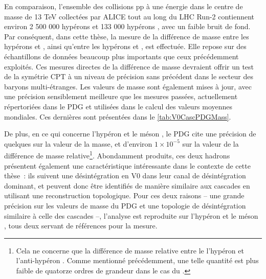 En comparaison, l'ensemble des collisions pp à une énergie dans le centre de masse de 13 TeV collectées par ALICE tout au long du LHC Run-2 contiennent environ 2 500 000 hypérons \rmXi et 133 000 hypérons \rmOmega, avec un faible bruit de fond. Par conséquent, dans cette thèse, la mesure de la différence de masse entre les hypérons \rmXiM et \rmAxiP, ainsi qu'entre les hypérons \rmOmegaM et \rmAomegaP, est effectuée. Elle repose sur des échantillons de données beaucoup plus importants que ceux précédemment exploités. Ces mesures directes de la différence de masse devraient offrir un test de la symétrie CPT à un niveau de précision sans précédent dans le secteur des baryons multi-étranges. Les valeurs de masse sont également mises à jour, avec une précision sensiblement meilleure que les mesures passées, actuellement répertoriées dans le PDG et utilisées dans le calcul des valeurs moyennes mondiales. Ces dernières sont présentées dans le \tab\ref{tab:V0CascPDGMass}.

De plus, en ce qui concerne l'hypéron \rmLambda et le méson \rmKzeroS, le PDG cite une précision de quelques \kmass sur la valeur de la masse, et d'environ $1 \times 10^{-5}$ sur la valeur de la différence de masse relative\footnote{Cela ne concerne que la différence de masse relative entre le l'hypéron \rmLambda et l'anti-hypéron \rmAlambda. Comme mentionné précédemment, une telle quantité est plus faible de quatorze ordres de grandeur dans le cas du \rmKzeroS.}. Abondamment produits, ces deux hadrons présentent également une caractéristique intéressante dans le contexte de cette thèse~: ils suivent une désintégration en V0 dans leur canal de désintégration dominant, et peuvent donc être identifiés de manière similaire aux cascades en utilisant une reconstruction topologique. Pour ces deux raisons -- une grande précision sur les valeurs de masse du PDG et une topologie de désintégration similaire à celle des cascades --, l'analyse est reproduite sur l'hypéron \rmLambda et le méson \rmKzeroS, tous deux servant de références pour la mesure.\\

